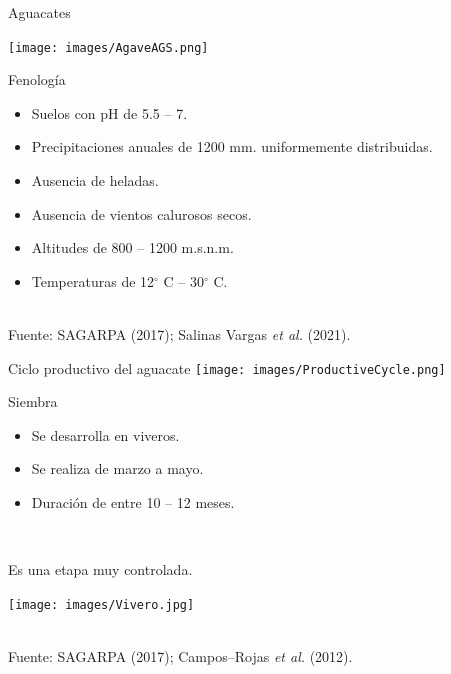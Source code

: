 \documentclass[aspectratio=169]{beamer}
\begin{document}
\begin{frame}{Aguacates}
    \vspace{-1cm}
    \begin{minipage}{0.5\textwidth}
			\hspace{-0.5cm}\texttt{[image: images/AgaveAGS.png]}
		\end{minipage}%
		\begin{minipage}{0.5\textwidth}
            \begin{block}{Fenología}
                \begin{itemize}
				\item Suelos con pH de 5.5 -- 7.
                    \item Precipitaciones anuales de 1200 mm. uniformemente distribuidas.
                    \item Ausencia de heladas.
                    \item Ausencia de vientos calurosos secos.
                    \item Altitudes de 800 -- 1200 m.s.n.m.
                    \item Temperaturas de 12$^\circ$ C -- 30$^\circ$ C. 
			\end{itemize}
            \end{block}
		\end{minipage}
        \,\\
        \hfill {\scriptsize Fuente: SAGARPA (2017); Salinas Vargas \textit{et al.} (2021).}
\end{frame}



\begin{frame}{Ciclo productivo del aguacate}
    \texttt{[image: images/ProductiveCycle.png]}
\end{frame}

\begin{frame}{Siembra}
    \vspace{-1cm}
		\begin{minipage}{0.5\textwidth}
            \begin{block}{}
                \begin{itemize}
				\item Se desarrolla en viveros.
                    \item Se realiza de marzo a mayo.
                    \item Duración de entre 10 -- 12 meses.
			\end{itemize}
            \end{block}
            \pause\,\\
            \begin{block}{Es una etapa muy controlada.}
            \end{block}
		\end{minipage}%
        \begin{minipage}{0.5\textwidth}
        \centering
\texttt{[image: images/Vivero.jpg]}
		\end{minipage}%
        \,\\
        \hfill {\scriptsize Fuente: SAGARPA (2017); Campos–Rojas \textit{et al.} (2012).}
\end{frame}
\end{document}
